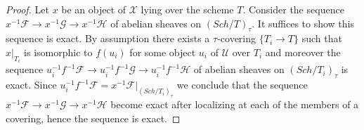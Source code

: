 \documentclass[10pt,a4paper]{amsart}
\theoremstyle{plain}
\theoremstyle{definition}
\theoremstyle{remark}
\numberwithin{equation}{subsection}
\def\Sch{\mathit{Sch}}
\begin{document}
\begin{proof}
Let $x$ be an object of $\mathcal{X}$ lying over the scheme $T$.
Consider the sequence
$x^{-1}\mathcal{F} \to x^{-1}\mathcal{G} \to x^{-1}\mathcal{H}$
of abelian sheaves on $(\Sch/T)_\tau$. It suffices to show
this sequence is exact. By assumption there exists a $\tau$-covering
$\{T_i \to T\}$ such that $x|_{T_i}$ is isomorphic to $f(u_i)$ for
some object $u_i$ of $\mathcal{U}$ over $T_i$ and moreover the sequence
$u_i^{-1}f^{-1}\mathcal{F} \to u_i^{-1}f^{-1}\mathcal{G} \to
u_i^{-1}f^{-1}\mathcal{H}$ of abelian sheaves on $(\Sch/T_i)_\tau$
is exact. Since
$u_i^{-1}f^{-1}\mathcal{F} = x^{-1}\mathcal{F}|_{(\Sch/T_i)_\tau}$
we conclude that the sequence
$x^{-1}\mathcal{F} \to x^{-1}\mathcal{G} \to x^{-1}\mathcal{H}$
become exact after localizing at each of the members of a covering,
hence the sequence is exact.
\end{proof}
\end{document}
